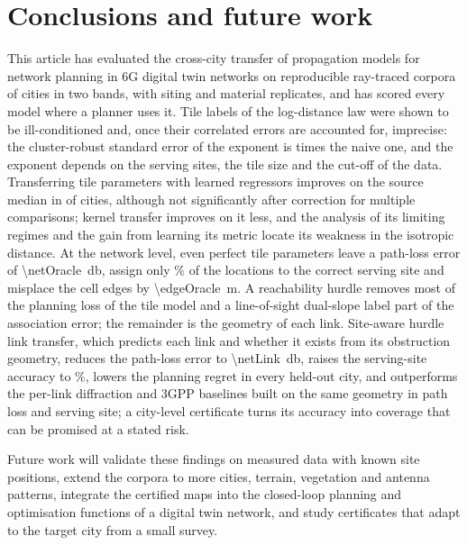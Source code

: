 \section{Conclusions and future work}
\label{sec:conclusion}

This article has evaluated the cross-city transfer of propagation models
for network planning in 6G digital twin networks on reproducible ray-traced
corpora of \nCities{} cities in two bands, with siting and material
replicates, and has scored every model where a planner uses it. Tile labels
of the log-distance law were shown to be ill-conditioned and, once their
correlated errors are accounted for, imprecise: the cluster-robust standard
error of the exponent is \seRatio{} times the naive one, and the exponent
depends on the serving sites, the tile size and the cut-off of the data.
Transferring tile parameters with learned regressors improves on the source
median in \nGbdtMedian{} of \nFolds{} cities, although not significantly
after correction for multiple comparisons; kernel transfer improves on it
less, and the analysis of its limiting regimes and the gain from learning
its metric locate its weakness in the isotropic distance. At the network
level, even perfect tile parameters leave a path-loss error of
\SI{\netOracle}{\decibel}, assign only \assocOracle\% of the locations to
the correct serving site and misplace the cell edges by
\SI{\edgeOracle}{\metre}. A reachability hurdle removes most of the planning
loss of the tile model and a line-of-sight dual-slope label part of the
association error; the remainder is the geometry of each link. Site-aware
hurdle link transfer, which predicts each link and whether it exists from
its obstruction geometry, reduces the path-loss error to
\SI{\netLink}{\decibel}, raises the serving-site accuracy to \assocLink\%,
lowers the planning regret in every held-out city, and outperforms the
per-link diffraction and 3GPP baselines built on the same geometry in path
loss and serving site; a city-level certificate turns its accuracy into
coverage that can be promised at a stated risk.

Future work will validate these findings on measured data with known site
positions, extend the corpora to more cities, terrain, vegetation and
antenna patterns, integrate the certified maps into the closed-loop
planning and optimisation functions of a digital twin network, and study
certificates that adapt to the target city from a small survey.
